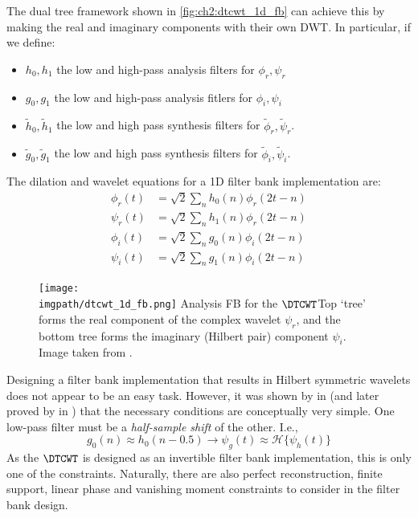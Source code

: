   The dual tree framework shown in \autoref{fig:ch2:dtcwt_1d_fb} can achieve this 
  by making the real and imaginary components with their own DWT. In particular, if
  we define:
  \begin{itemize}
    \item $h_0, h_1$ the low and high-pass analysis filters for $\phi_r, \psi_r$  
    \item $g_0, g_1$ the low and high-pass analysis fitlers for $\phi_i, \psi_i$
    \item $\tilde{h}_0, \tilde{h}_1$ the low and high pass synthesis filters
      for $\tilde{\phi}_r, \tilde{\psi}_r$.
    \item $\tilde{g}_0, \tilde{g}_1$ the low and high pass synthesis filters for
      $\tilde{\phi}_i, \tilde{\psi}_i$.
  \end{itemize}

  The dilation and wavelet equations for a 1D filter bank implementation are:
  \begin{align}
    \phi_r(t) & =  \sqrt{2} \sum_n h_0(n) \phi_r(2t-n) \\
    \psi_r(t) & =  \sqrt{2} \sum_n h_1(n) \phi_r(2t-n) \\
    \phi_i(t) & =  \sqrt{2} \sum_n g_0(n) \phi_i(2t-n) \\
    \psi_i(t) & =  \sqrt{2} \sum_n g_1(n) \phi_i(2t-n) 
  \end{align}

  \begin{figure}
    \centering
      \texttt{[image: \\imgpath/dtcwt\_1d\_fb.png]}
      \mycaption
      {Analysis FB for the $\DTCWT$}{Top `tree' forms the real component of the
      complex wavelet $\psi_r$, and the bottom tree forms the imaginary (Hilbert
      pair) component $\psi_i$. Image taken from
      \cite{selesnick_dual-tree_2005}.}
      \label{fig:ch2:dtcwt_1d_fb}
  \end{figure}

  Designing a filter bank implementation that results in Hilbert symmetric
  wavelets does not appear to be an easy task. However, it was shown
  by \citeauthor{kingsbury_image_1999} in \cite{kingsbury_image_1999} (and later proved by
  \citeauthor{selesnick_hilbert_2001} in \cite{selesnick_hilbert_2001}) that the
  necessary conditions are conceptually very simple. One low-pass filter must be
  a \emph{half-sample shift} of the other. I.e.,\ 
  \begin{equation}
    g_0(n) \approx h_0(n-0.5) \rightarrow \psi_g(t) \approx
    \mathcal{H}\{\psi_h(t)\}
  \end{equation}
  As the $\DTCWT$ is designed as an invertible filter bank implementation, this
  is only one of the constraints. Naturally, there are also perfect
  reconstruction, finite support, linear phase and vanishing moment constraints
  to consider in the filter bank design.

